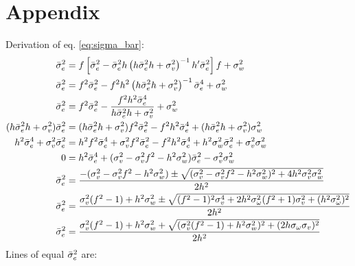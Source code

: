 \documentclass[oneside,12pt]{article}
\begin{document}
\section{Appendix}\label{sec:appendix}
Derivation of eq. \ref{eq:sigma_bar}:
%
\begin{equation*}
    \begin{split}
        \Bar{\sigma}_e^2 &= f \left[\Bar{\sigma}_e^2 - \Bar{\sigma}_e^2 h \left( h\Bar{\sigma}_e^2 h+\sigma_v^2 \right)^{-1}h'\Bar{\sigma}_e^2 \right] f + \sigma_w^2\\
        \Bar{\sigma}_e^2 &= f^2\Bar{\sigma}_e^2 - f^2 h^2 \left( h\Bar{\sigma}_e^2 h+\sigma_v^2 \right)^{-1}\Bar{\sigma}_e^4 + \sigma_w^2\\
        \Bar{\sigma}_e^2 &= f^2\Bar{\sigma}_e^2 - \frac{f^2 h^2 \Bar{\sigma}_e^4}{h\Bar{\sigma}_e^2 h+\sigma_v^2} + \sigma_w^2\\
        (h\Bar{\sigma}_e^2 h+\sigma_v^2)\Bar{\sigma}_e^2 &= (h\Bar{\sigma}_e^2 h+\sigma_v^2)f^2\Bar{\sigma}_e^2 - f^2 h^2 \Bar{\sigma}_e^4 + (h\Bar{\sigma}_e^2 h+\sigma_v^2)\sigma_w^2\\
        h^2\Bar{\sigma}_e^4 + \sigma_v^2\Bar{\sigma}_e^2 &= h^2 f^2\Bar{\sigma}_e^4 + \sigma_v^2f^2\Bar{\sigma}_e^2 - f^2 h^2 \Bar{\sigma}_e^4 + h^2\sigma_w^2\Bar{\sigma}_e^2 + \sigma_v^2\sigma_w^2\\
        0&= h^2\Bar{\sigma}_e^4 + (\sigma_v^2-\sigma_v^2f^2-h^2\sigma_w^2)\Bar{\sigma}_e^2 -\sigma_v^2\sigma_w^2\\
        \Bar{\sigma}_e^2 &= \frac{-(\sigma_v^2-\sigma_v^2f^2-h^2\sigma_w^2) \pm \sqrt{(\sigma_v^2-\sigma_v^2f^2-h^2\sigma_w^2)^2 + 4h^2\sigma_v^2\sigma_w^2}}{2h^2}\\
        \Bar{\sigma}_e^2 &= \frac{\sigma_v^2(f^2-1)+h^2\sigma_w^2 \pm \sqrt{(f^2-1)^2\sigma_v^4 + 2h^2\sigma_\omega^2(f^2+1)\sigma_v^2+(h^2\sigma_\omega^2)^2}}{2h^2}\\
        \Bar{\sigma}_e^2 &= \frac{\sigma_v^2(f^2-1)+h^2\sigma_w^2 + \sqrt{(\sigma_v^2(f^2-1)+h^2\sigma_w^2)^2 + (2h\sigma_\omega\sigma_v)^2}}{2h^2}\\
    \end{split}
\end{equation*}
%
Lines of equal $\Bar{\sigma}_e^2$ are:  
%
\end{document}
